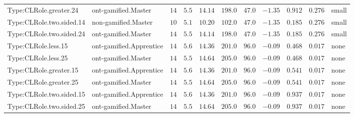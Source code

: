 \documentclass[6pt,a4paper]{article}
\begin{document}
{\begin{longtable}{llrrrrrrrrl}
Type:CLRole.greater.24&ont-gamified.Master&$14$&$5.5$&$14.14$&$198.0$&$ 47.0$&$-1.35$&$0.912$&$0.276$&small\tabularnewline
Type:CLRole.two.sided.14&non-gamified.Master&$10$&$5.1$&$10.20$&$102.0$&$ 47.0$&$-1.35$&$0.185$&$0.276$&small\tabularnewline
Type:CLRole.two.sided.24&ont-gamified.Master&$14$&$5.5$&$14.14$&$198.0$&$ 47.0$&$-1.35$&$0.185$&$0.276$&small\tabularnewline
Type:CLRole.less.15&ont-gamified.Apprentice&$14$&$5.6$&$14.36$&$201.0$&$ 96.0$&$-0.09$&$0.468$&$0.017$&none\tabularnewline
Type:CLRole.less.25&ont-gamified.Master&$14$&$5.5$&$14.64$&$205.0$&$ 96.0$&$-0.09$&$0.468$&$0.017$&none\tabularnewline
Type:CLRole.greater.15&ont-gamified.Apprentice&$14$&$5.6$&$14.36$&$201.0$&$ 96.0$&$-0.09$&$0.541$&$0.017$&none\tabularnewline
Type:CLRole.greater.25&ont-gamified.Master&$14$&$5.5$&$14.64$&$205.0$&$ 96.0$&$-0.09$&$0.541$&$0.017$&none\tabularnewline
\newpage
Type:CLRole.two.sided.15&ont-gamified.Apprentice&$14$&$5.6$&$14.36$&$201.0$&$ 96.0$&$-0.09$&$0.937$&$0.017$&none\tabularnewline
Type:CLRole.two.sided.25&ont-gamified.Master&$14$&$5.5$&$14.64$&$205.0$&$ 96.0$&$-0.09$&$0.937$&$0.017$&none\tabularnewline
\hline
\end{longtable}}
\end{document}

